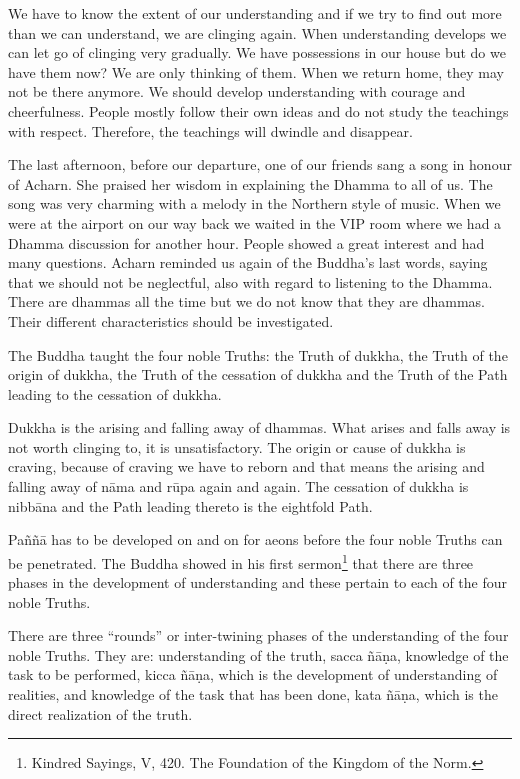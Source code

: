 We have to know the extent of our understanding and if we try to find
out more than we can understand, we are clinging again. When
understanding develops we can let go of clinging very gradually. We have
possessions in our house but do we have them now? We are only thinking
of them. When we return home, they may not be there anymore. We should
develop understanding with courage and cheerfulness. People mostly
follow their own ideas and do not study the teachings with respect.
Therefore, the teachings will dwindle and disappear.

The last afternoon, before our departure, one of our friends sang a song
in honour of Acharn. She praised her wisdom in explaining the Dhamma to
all of us. The song was very charming with a melody in the Northern
style of music. When we were at the airport on our way back we waited in
the VIP room where we had a Dhamma discussion for another hour. People
showed a great interest and had many questions. Acharn reminded us again
of the Buddha's last words, saying that we should not be neglectful,
also with regard to listening to the Dhamma. There are dhammas all the
time but we do not know that they are dhammas. Their different
characteristics should be investigated.

The Buddha taught the four noble Truths: the Truth of dukkha, the Truth
of the origin of dukkha, the Truth of the cessation of dukkha and the
Truth of the Path leading to the cessation of dukkha.

Dukkha is the arising and falling away of dhammas. What arises and falls
away is not worth clinging to, it is unsatisfactory. The origin or cause
of dukkha is craving, because of craving we have to reborn and that
means the arising and falling away of nāma and rūpa again and again. The
cessation of dukkha is nibbāna and the Path leading thereto is the
eightfold Path.

Paññā has to be developed on and on for aeons before the four noble
Truths can be penetrated. The Buddha showed in his first sermon\footnote{Kindred Sayings, V,
420. The Foundation of the Kingdom of the Norm.
} that there are three
phases in the development of understanding and these pertain to each of
the four noble Truths.

There are three ``rounds'' or inter-twining phases of the understanding
of the four noble Truths. They are: understanding of the truth, sacca
ñāṇa, knowledge of the task to be performed, kicca ñāṇa, which is the
development of understanding of realities, and knowledge of the task
that has been done, kata ñāṇa, which is the direct realization of the
truth.

